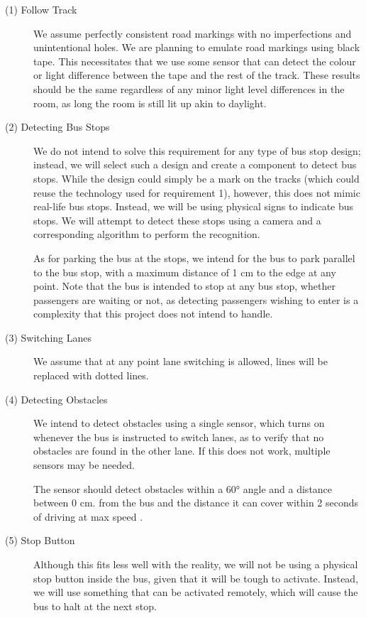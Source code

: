 \begin{description}
    \item [(1) Follow Track]
    We assume perfectly consistent road markings with no imperfections and unintentional holes. We are planning to emulate road markings using black tape. This necessitates that we use some sensor that can detect the colour or light difference between the tape and the rest of the track. These results should be the same regardless of any minor light level differences in the room, as long the room is still lit up akin to daylight. 

    \item[(2) Detecting Bus Stops]
    We do not intend to solve this requirement for any type of bus stop design; instead, we will select such a design and create a component to detect bus stops. While the design could simply be a mark on the tracks (which could reuse the technology used for requirement 1), however, this does not mimic real-life bus stops. Instead, we will be using physical signs to indicate bus stops. We will attempt to detect these stops using a camera and a corresponding algorithm to perform the recognition. 
    
    As for parking the bus at the stops, we intend for the bus to park parallel to the bus stop, with a maximum distance of 1 cm to the edge at any point. Note that the bus is intended to stop at any bus stop, whether passengers are waiting or not, as detecting passengers wishing to enter is a complexity that this project does not intend to handle. 

    \item[(3) Switching Lanes] 
    We assume that at any point lane switching is allowed, lines will be replaced with dotted lines. 

    \item[(4) Detecting Obstacles]
    We intend to detect obstacles using a single sensor, which turns on whenever the bus is instructed to switch lanes, as to verify that no obstacles are found in the other lane. If this does not work, multiple sensors may be needed.

    The sensor should detect obstacles within a 60° angle and a distance between 0 cm. from the bus and the distance it can cover within 2 seconds of driving at max speed \cite{holdAfstand}.
    
    \item[(5) Stop Button]
    Although this fits less well with the reality, we will not be using a physical stop button inside the bus, given that it will be tough to activate. Instead, we will use something that can be activated remotely, which will cause the bus to halt at the next stop.


\end{description}
